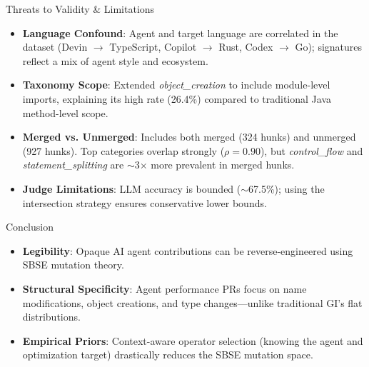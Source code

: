 \documentclass[aspectratio=169]{beamer}
\begin{document}
\begin{frame}{Threats to Validity \& Limitations}
  \begin{itemize}
    \item \textbf{Language Confound}: Agent and target language are correlated in the dataset (Devin $\rightarrow$ TypeScript, Copilot $\rightarrow$ Rust, Codex $\rightarrow$ Go); signatures reflect a mix of agent style and ecosystem.
    \item \textbf{Taxonomy Scope}: Extended \emph{object\_creation} to include module-level imports, explaining its high rate (26.4\%) compared to traditional Java method-level scope.
    \item \textbf{Merged vs. Unmerged}: Includes both merged (324 hunks) and unmerged (927 hunks). Top categories overlap strongly ($\rho = 0.90$), but \emph{control\_flow} and \emph{statement\_splitting} are $\sim$3$\times$ more prevalent in merged hunks.
    \item \textbf{Judge Limitations}: LLM accuracy is bounded ($\sim$67.5\%); using the intersection strategy ensures conservative lower bounds.
  \end{itemize}
\end{frame}

\begin{frame}{Conclusion}
  \begin{itemize}
    \item \textbf{Legibility}: Opaque AI agent contributions can be reverse-engineered using SBSE mutation theory.
    \item \textbf{Structural Specificity}: Agent performance PRs focus on name modifications, object creations, and type changes—unlike traditional GI's flat distributions.
    \item \textbf{Empirical Priors}: Context-aware operator selection (knowing the agent and optimization target) drastically reduces the SBSE mutation space.
  \end{itemize}
\end{frame}
\end{document}
